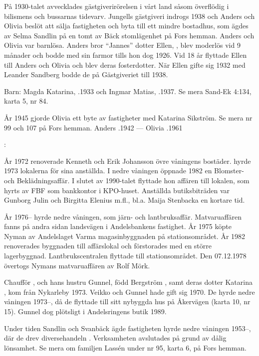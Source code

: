 På 1930-talet avvecklades gästgiverirörelsen i vårt land såsom överflödig	i bilismens och bussarnas tidevarv. Jungells gästgiveri indrogs 1938 och	Anders och Olivia beslöt att sälja fastigheten och byta till ett mindre	bostadhus, som ägdes av Selma Sandlin på en tomt av Bäck stomlägenhet på Fors hemman. Anders och Olivia var barnlösa. Anders bror ``Jannes'' 	dotter Ellen, , blev moderlös vid 9 månader och bodde med sin farmor tills hon dog 1926. Vid 18 år flyttade Ellen till Anders och	Olivia och blev deras fosterdotter. När Ellen gifte sig 1932 med Leander Sandberg bodde de på Gästgiveriet till 1938.

Barn:	Magda Katarina,	.1933 och Ingmar Matias,	.1937.	Se mera Sand-Ek 4:134, karta 5, nr 84.

År 1945 gjorde Olivia ett byte av fastigheter med Katarina Sikström. Se	mera nr 99 och 107 på Fors hemman.
Anders .1942  ---  Olivia .1961


:

År 1972 renoverade Kenneth och Erik Johansson övre våningens bostäder.  hyrde 1973 lokalerna för sina anställda. I nedre våningen öppnade  1982 en Blomster- och	Beklädningsaffär. I slutet av 1990-talet flyttade hon affären till lokalen,	som hyrts av FBF som bankkontor i KPO-huset. Anställda butiksbiträden	var Gunborg Julin och Birgitta Elenius m.fl., bl.a. Maija Stenbacka en kortare tid.

År 1976-- hyrde  nedre våningen, som järn- och	lantbruksaffär. Matvaruaffären fanns på andra sidan landsvägen i	Andelsbankens fastighet. År 1975 köpte Nyman av Andelslaget Varma magasinbyggnaden på stationsområdet. År 1982 renoverades byggnaden till affärslokal och förstorades med en större lagerbyggnad. Lantbrukscentralen flyttade till stationsområdet. Den 07.12.1978 	övertogs Nymans matvaruaffären av Rolf Mörk.

Chaufför ,  och hans hustru Gunnel, född Bergström , samt deras dotter Katarina , kom från Nykarleby 1973. Veikko och Gunnel hade gift sig 1970. De hyrde nedre våningen 1973--, då de flyttade till sitt nybyggda hus på Åkervägen (karta 10, nr 15). Gunnel dog plötsligt i Andelsringens butik 1989.

Under tiden Sandlin och Svanbäck ägde fastigheten hyrde  nedre våningen 1953--, där de drev diversehandeln	. Verksamheten avslutades på grund av dålig lönsamhet. Se mera om familjen Lassén under nr 95, karta 6, på Fors hemman.

